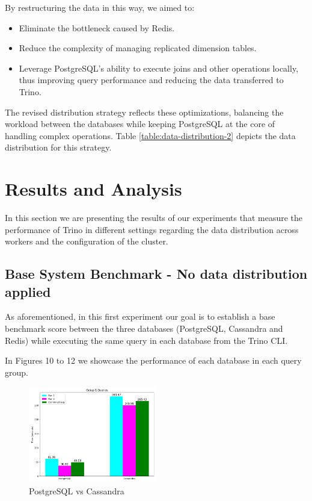 \documentclass[conference]{IEEEtran}
\begin{document}
By restructuring the data in this way, we aimed to:
\begin{itemize}
	\item Eliminate the bottleneck caused by Redis.
	\item Reduce the complexity of managing replicated dimension tables.
	\item Leverage PostgreSQL’s ability to execute joins and other operations locally, thus improving query
	      performance and reducing the data transferred to Trino.
\end{itemize}

The revised distribution strategy reflects these optimizations, balancing the workload between the databases
while keeping PostgreSQL at the core of handling complex operations.
Table \ref{table:data-distribution-2} depicts the data distribution for this strategy.

\section{Results and Analysis}

In this section we are presenting the results of our experiments that measure the performance of Trino in different settings regarding the data distribution across workers and the configuration of the cluster.

\subsection{Base System Benchmark - No data distribution applied}
\label{sec:no-data-distribution}

As aforementioned, in this first experiment our goal is to establish a base benchmark score between the three databases (PostgreSQL, Cassandra and Redis) while executing the same query in each database from the Trino CLI.

In Figures 10 to 12 we showcase the performance of each database in each query group.

\begin{figure}[h]
	\centering
	\includegraphics[width=0.5\textwidth]{images/DBs_bench_no_distro/group1.png}
	\caption{PostgreSQL vs Cassandra}
	\label{fig:psql-cass-group1}
\end{figure}
\end{document}
